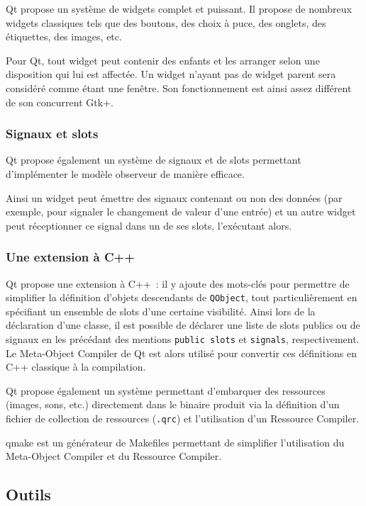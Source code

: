Qt propose un système de widgets complet et puissant. Il propose de nombreux widgets classiques tels que des boutons, des choix à puce, des onglets, des étiquettes, des images, etc.

Pour Qt, tout widget peut contenir des enfants et les arranger selon une disposition qui lui est affectée. Un widget n'ayant pas de widget parent sera considéré comme étant une fenêtre.
Son fonctionnement est ainsi assez différent de son concurrent Gtk+.

\subsubsection{Signaux et slots}

Qt propose également un système de signaux et de slots permettant d'implémenter le modèle observeur de manière efficace.

Ainsi un widget peut émettre des signaux contenant ou non des données (par exemple, pour signaler le changement de valeur d'une entrée) et un autre widget peut réceptionner ce signal dans un de ses slots, l'exécutant alors.

\subsubsection{Une extension à C++}

Qt propose une extension à C++~: il y ajoute des mots-clés pour permettre de simplifier la définition d'objets descendants de \verb|QObject|, tout particulièrement en spécifiant un ensemble de slots d'une certaine visibilité.
Ainsi lors de la déclaration d'une classe, il est possible de déclarer une liste de slots publics ou de signaux en les précédant des mentions \verb|public slots| et \verb|signals|, respectivement.
Le Meta-Object Compiler de Qt est alors utilisé pour convertir ces définitions en C++ classique à la compilation.

Qt propose également un système permettant d'embarquer des ressources (images, sons, etc.) directement dans le binaire produit via la définition d'un fichier de collection de ressources (\verb|.qrc|) et l'utilisation d'un Ressource Compiler.

qmake est un générateur de Makefiles permettant de simplifier l'utilisation du Meta-Object Compiler et du Ressource Compiler.

\subsection{Outils}

